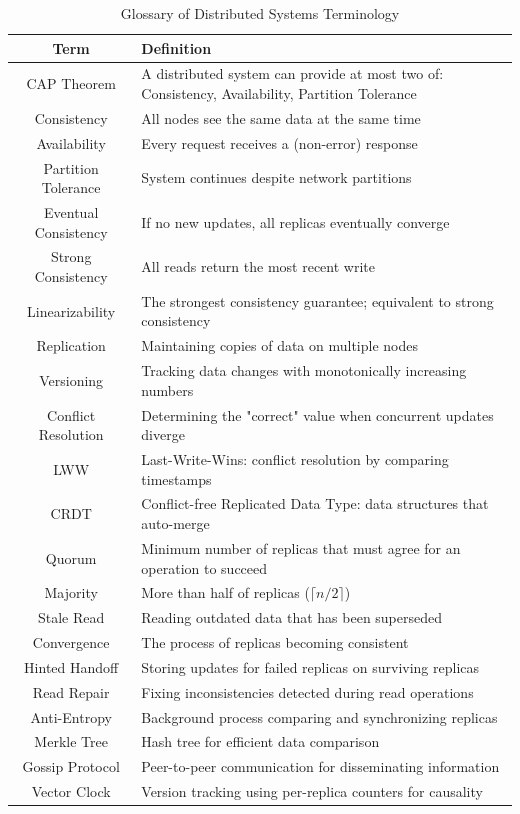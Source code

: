 \documentclass[10pt,a4paper]{article}
\begin{document}
\begin{table}[H]
\centering
\caption{Glossary of Distributed Systems Terminology}
\begin{tabular}{|c|p{8cm}|}
\hline
\textbf{Term} & \textbf{Definition} \\
\hline
CAP Theorem & A distributed system can provide at most two of: Consistency, Availability, Partition Tolerance \\
\hline
Consistency & All nodes see the same data at the same time \\
\hline
Availability & Every request receives a (non-error) response \\
\hline
Partition Tolerance & System continues despite network partitions \\
\hline
Eventual Consistency & If no new updates, all replicas eventually converge \\
\hline
Strong Consistency & All reads return the most recent write \\
\hline
Linearizability & The strongest consistency guarantee; equivalent to strong consistency \\
\hline
Replication & Maintaining copies of data on multiple nodes \\
\hline
Versioning & Tracking data changes with monotonically increasing numbers \\
\hline
Conflict Resolution & Determining the "correct" value when concurrent updates diverge \\
\hline
LWW & Last-Write-Wins: conflict resolution by comparing timestamps \\
\hline
CRDT & Conflict-free Replicated Data Type: data structures that auto-merge \\
\hline
Quorum & Minimum number of replicas that must agree for an operation to succeed \\
\hline
Majority & More than half of replicas ($\lceil n/2 \rceil$) \\
\hline
Stale Read & Reading outdated data that has been superseded \\
\hline
Convergence & The process of replicas becoming consistent \\
\hline
Hinted Handoff & Storing updates for failed replicas on surviving replicas \\
\hline
Read Repair & Fixing inconsistencies detected during read operations \\
\hline
Anti-Entropy & Background process comparing and synchronizing replicas \\
\hline
Merkle Tree & Hash tree for efficient data comparison \\
\hline
Gossip Protocol & Peer-to-peer communication for disseminating information \\
\hline
Vector Clock & Version tracking using per-replica counters for causality \\
\hline
\end{tabular}
\end{table}
\end{document}
